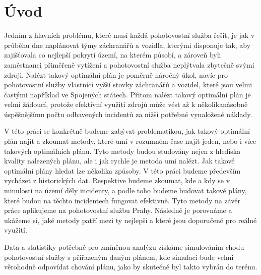 \chapter*{Úvod}

Jedním z hlavních problému, které musí každá pohotovostní služba řešit, je jak v průběhu dne naplánovat týmy záchranářů a vozidla, kterými disponuje tak,
aby zajišťovala co nejlepší pokrytí území, na kterém působí, a zároveň byli zaměstnanci přiměřeně vytížení a pohotovostní služba neplýtvala zbytečně svými zdroji.
Nalézt takový optimální plán je poměrně náročný úkol, navíc pro pohotovostní služby vlastnící vyšší stovky záchranářů a vozidel, které jsou velmi častými například ve Spojených státech.
Přitom nalézt takový optimální plán je velmi žádoucí, protože efektivní využití zdrojů může vést až k několikanásobně úspěšnějšímu počtu odbavených incidentů
za nižší potřebné vynaložené náklady.

V této práci se konkrétně budeme zabývat problematikou, jak takový optimální plán najít a zkoumat metody,
které umí v rozumném čase najít jeden, nebo i více takových optimálních plánu.
Tyto metody budou studovány nejen z hlediska kvality nalezených plánu, ale i jak rychle je metoda umí nalézt.
Jak takové optimální plány hledat lze několika způsoby. V této práci budeme především vycházet z historických dat.
Respektive budeme zkoumat, kde a kdy se v minulosti na území děly incidenty, a podle toho budeme budovat takové plány, které budou na těchto incidentech fungovat efektivně.
Tyto metody na závěr práce aplikujeme na pohotovostní službu Prahy. Následně je porovnáme a ukážeme si, jaké metody patří mezi ty nejlepší a které jsou doporučené pro reálné využití. 

Data a statistiky potřebné pro zmíněnou analýzu získáme simulováním chodu pohotovostní služby s přiřazeným daným plánem, kde simulaci bude velmi věrohodně odpovídat chování plánu,
jako by skutečně byl takto vybrán do terénu.

